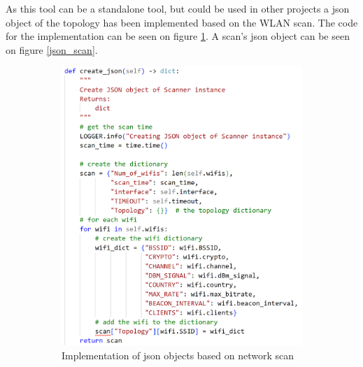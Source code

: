 As this tool can be a standalone tool, but could be used in other projects a json object of the topology has been implemented based on the WLAN scan. The code for the implementation can be seen on figure \ref{create_json_code}. A scan's json object can be seen on figure \ref{json_scan}.

\begin{figure}[!htbp]
    \centering
     \begin{subfigure}{0.49\textwidth}
         \centering
         \includegraphics[width=\textwidth]{Latex-Files/Billeder/create_json_code.png}
         \caption{Implementation of json objects based on network scan}
         \label{create_json_code}
     \end{subfigure}
      \begin{subfigure}{0.49\textwidth}
         \centering

\end{subfigure}
\end{figure}
